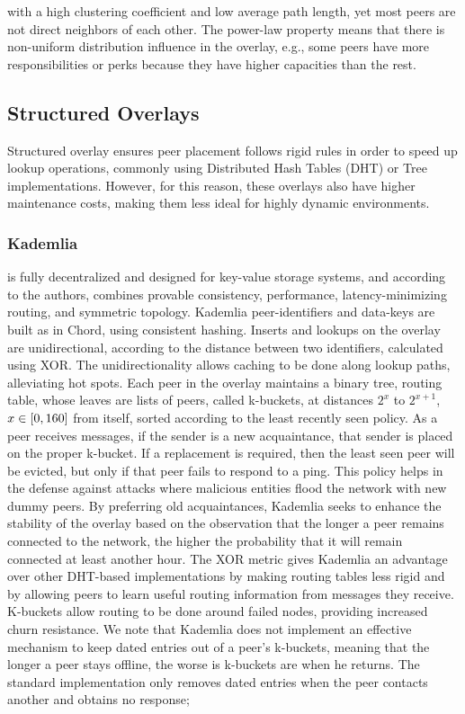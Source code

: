 \documentclass[runningheads]{llncs}
\begin{document}
with a high clustering coefficient and low average path length, yet most peers are not direct neighbors of each other. The power-law property means that there is non-uniform distribution influence in the overlay, e.g., some peers have more responsibilities or perks because they have higher capacities than the rest.

\subsection{Structured Overlays}
Structured overlay ensures peer placement follows rigid rules in order to speed up lookup operations, commonly using Distributed Hash Tables (DHT) or Tree implementations. However, for this reason, these overlays also have higher maintenance costs, making them less ideal for highly dynamic environments.

\subsubsection{Kademlia}\cite{kademlia} is fully decentralized and designed for key-value storage systems, and according to the authors, combines provable consistency, performance, latency-minimizing routing, and symmetric topology. Kademlia peer-identifiers and data-keys are built as in Chord\cite{chord}, using consistent hashing. Inserts and lookups on the overlay are unidirectional, according to the distance between two identifiers, calculated using XOR. The unidirectionality allows caching to be done along lookup paths, alleviating hot spots. Each peer in the overlay maintains a binary tree, routing table, whose leaves are lists of peers, called k-buckets, at distances $2^{x}$ to $2^{x+1}$, $x \in\hspace{1mm}\mathclose[0,160\mathclose]$ from itself, sorted according to the least recently seen policy. As a peer receives messages, if the sender is a new acquaintance, that sender is placed on the proper k-bucket. If a replacement is required, then the least seen peer will be evicted, but only if that peer fails to respond to a ping. This policy helps in the defense against attacks where malicious entities flood the network with new dummy peers. By preferring old acquaintances, Kademlia seeks to enhance the stability of the overlay based on the observation that the longer a peer remains connected to the network, the higher the probability that it will remain connected at least another hour\cite{ssaroiu:msp2pfss}. The XOR metric gives Kademlia an advantage over other DHT-based implementations by making routing tables less rigid and by allowing peers to learn useful routing information from messages they receive. K-buckets allow routing to be done around failed nodes, providing increased churn resistance. We note that Kademlia does not implement an effective mechanism to keep dated entries out of a peer's k-buckets, meaning that the longer a peer stays offline, the worse is k-buckets are when he returns. The standard implementation only removes dated entries when the peer contacts another and obtains no response;
\end{document}
